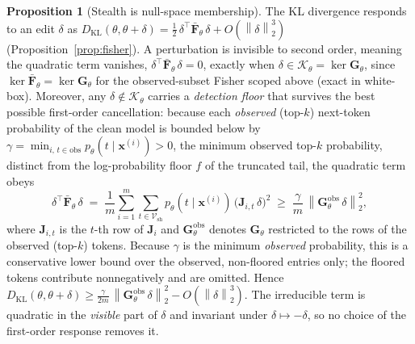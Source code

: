 \documentclass[11pt]{article}
\newcommand{\Vsh}{\mathcal{V}_{\mathrm{sh}}}
\newcommand{\norm}[1]{\left\lVert #1 \right\rVert}
\theoremstyle{definition}
\newtheorem{proposition}{Proposition}
\begin{document}
\begin{proposition}[Stealth is null-space membership]
\label{prop:stealth}
The KL divergence responds to an edit $\delta$ as
$D_{\mathrm{KL}}(\theta, \theta+\delta) = \tfrac12\, \delta^\top
\bar{\bm{F}}_\theta\, \delta + O(\norm{\delta}_2^3)$
(Proposition~\ref{prop:fisher}). A perturbation is invisible to second
order, meaning the quadratic term vanishes, $\delta^\top \bar{\bm{F}}_\theta\, \delta
= 0$, exactly when $\delta \in \mathcal{K}_\theta = \ker \bm{G}_\theta$, since
$\ker \bar{\bm{F}}_\theta = \ker \bm{G}_\theta$ for the observed-subset Fisher
scoped above (exact in white-box). Moreover, any $\delta \notin
\mathcal{K}_\theta$ carries a \emph{detection floor} that survives the best
possible first-order cancellation: because each \emph{observed} (top-$k$)
next-token probability of the clean model is bounded below by
$\gamma = \min_{i,\, t \in \mathrm{obs}} p_\theta(t \mid \bm{x}^{(i)}) > 0$, the
minimum observed top-$k$ probability, distinct from the log-probability floor $f$
of the truncated tail, the quadratic term obeys
\begin{equation}
  \delta^\top \bar{\bm{F}}_\theta\, \delta
  \;=\; \frac1m \sum_{i=1}^m \sum_{t \in \Vsh}
      p_\theta(t \mid \bm{x}^{(i)})\, \big(\bm{J}_{i,t}\,\delta\big)^2
  \;\ge\; \frac{\gamma}{m}\, \norm{\bm{G}^{\mathrm{obs}}_\theta\,\delta}_2^2,
  \label{eq:floor}
\end{equation}
where $\bm{J}_{i,t}$ is the $t$-th row of $\bm{J}_i$ and
$\bm{G}^{\mathrm{obs}}_\theta$ denotes $\bm{G}_\theta$ restricted to the rows
of the observed (top-$k$) tokens. Because $\gamma$ is the minimum
\emph{observed} probability, this is a conservative lower bound over the
observed, non-floored entries only; the floored tokens contribute nonnegatively
and are omitted. Hence
$D_{\mathrm{KL}}(\theta, \theta+\delta) \ge \frac{\gamma}{2m}\,
\norm{\bm{G}^{\mathrm{obs}}_\theta\,\delta}_2^2 - O(\norm{\delta}_2^3)$. The irreducible term
is quadratic in the \emph{visible} part of $\delta$ and invariant under
$\delta \mapsto -\delta$, so no choice of the first-order response removes it.
\end{proposition}
\end{document}
